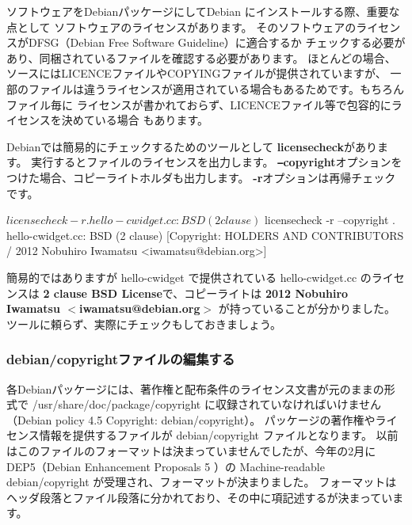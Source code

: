 \documentclass[mingoth,a4paper]{jsarticle}
\begin{document}
ソフトウェアをDebianパッケージにしてDebian にインストールする際、重要な点として
ソフトウェアのライセンスがあります。
そのソフトウェアのライセンスがDFSG（Debian Free Software Guideline）に適合するか
チェックする必要があり、同梱されているファイルを確認する必要があります。
ほとんどの場合、ソースにはLICENCEファイルやCOPYINGファイルが提供されていますが、
一部のファイルは違うライセンスが適用されている場合もあるためです。もちろんファイル毎に
ライセンスが書かれておらず、LICENCEファイル等で包容的にライセンスを決めている場合
もあります。

Debianでは簡易的にチェックするためのツールとして {\bf licensecheck}があります。
実行するとファイルのライセンスを出力します。
{\bf \texttt{--}copyright}オプションをつけた場合、コピーライトホルダも出力します。
{\bf -r}オプションは再帰チェックです。

\begin{commandline}
$ licensecheck -r .
hello-cwidget.cc: BSD (2 clause) 
$ licensecheck -r --copyright .
hello-cwidget.cc: BSD (2 clause) 
  [Copyright: HOLDERS AND CONTRIBUTORS / 2012 Nobuhiro Iwamatsu <iwamatsu@debian.org>]
\end{commandline}

簡易的ではありますが hello-cwidget で提供されている hello-cwidget.cc
のライセンスは {\bf 2 clause BSD License}で、コピーライトは {\bf 2012 Nobuhiro Iwamatsu $<$iwamatsu@debian.org$>$}
が持っていることが分かりました。
ツールに頼らず、実際にチェックもしておきましょう。

\subsubsection{debian/copyrightファイルの編集する}

各Debianパッケージには、著作権と配布条件のライセンス文書が元のままの形式で 
/usr/share/doc/package/copyright に収録されていなければいけません
（Debian policy 4.5 Copyright: debian/copyright）。
パッケージの著作権やライセンス情報を提供するファイルが debian/copyright ファイルとなります。
以前はこのファイルのフォーマットは決まっていませんでしたが、今年の2月に
DEP5（Debian Enhancement Proposals 5 ）の Machine-readable debian/copyright
が受理され、フォーマットが決まりました。
フォーマットはヘッダ段落とファイル段落に分かれており、その中に項記述するが決まっています。
\end{document}
